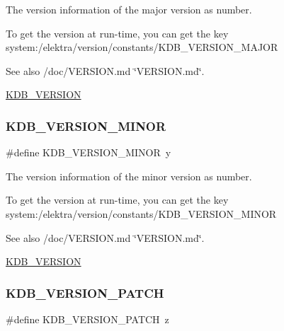 The version information of the major version as number. 

To get the version at run-\/time, you can get the key system\+:/elektra/version/constants/\+K\+D\+B\+\_\+\+V\+E\+R\+S\+I\+O\+N\+\_\+\+M\+A\+J\+OR

\begin{DoxySeeAlso}{See also}
/doc/\+V\+E\+R\+S\+I\+ON.md \char`\"{}\+V\+E\+R\+S\+I\+O\+N.\+md\char`\"{}. 

\hyperlink{group__kdb_ga2f8953fe5f9f28db54b3ef678ebf40d7}{K\+D\+B\+\_\+\+V\+E\+R\+S\+I\+ON} 
\end{DoxySeeAlso}
\mbox{\label{group__kdb_ga3407dacaacc5d83e2046db872b2408a9}} 
\subsubsection{\texorpdfstring{K\+D\+B\+\_\+\+V\+E\+R\+S\+I\+O\+N\+\_\+\+M\+I\+N\+OR}{KDB\_VERSION\_MINOR}}
{\footnotesize\ttfamily \#define K\+D\+B\+\_\+\+V\+E\+R\+S\+I\+O\+N\+\_\+\+M\+I\+N\+OR~y}



The version information of the minor version as number. 

To get the version at run-\/time, you can get the key system\+:/elektra/version/constants/\+K\+D\+B\+\_\+\+V\+E\+R\+S\+I\+O\+N\+\_\+\+M\+I\+N\+OR

\begin{DoxySeeAlso}{See also}
/doc/\+V\+E\+R\+S\+I\+ON.md \char`\"{}\+V\+E\+R\+S\+I\+O\+N.\+md\char`\"{}. 

\hyperlink{group__kdb_ga2f8953fe5f9f28db54b3ef678ebf40d7}{K\+D\+B\+\_\+\+V\+E\+R\+S\+I\+ON} 
\end{DoxySeeAlso}
\mbox{\label{group__kdb_gaa67fb397397981929b24f52ed2a2d92d}} 
\subsubsection{\texorpdfstring{K\+D\+B\+\_\+\+V\+E\+R\+S\+I\+O\+N\+\_\+\+P\+A\+T\+CH}{KDB\_VERSION\_PATCH}}
{\footnotesize\ttfamily \#define K\+D\+B\+\_\+\+V\+E\+R\+S\+I\+O\+N\+\_\+\+P\+A\+T\+CH~z}



